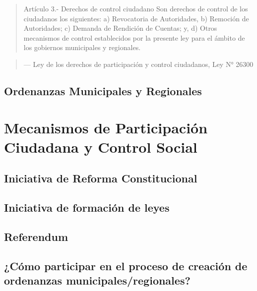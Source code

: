 \documentclass[
]{book}
\begin{document}
\begin{quote}
Artículo 3.- Derechos de control ciudadano
Son derechos de control de los ciudadanos los siguientes:
a) Revocatoria de Autoridades,
b) Remoción de Autoridades;
c) Demanda de Rendición de Cuentas; y,
d) Otros mecanismos de control establecidos por la presente ley para el ámbito de los gobiernos municipales y regionales.
\end{quote}

\begin{quote}
--- Ley de los derechos de participación y control ciudadanos, Ley N° 26300
\end{quote}

\hypertarget{ordenanzas-municipales-y-regionales}{%
\section{Ordenanzas Municipales y Regionales}\label{ordenanzas-municipales-y-regionales}}

\hypertarget{mecanismos-de-participaciuxf3n-ciudadana-y-control-social}{%
\chapter{Mecanismos de Participación Ciudadana y Control Social}\label{mecanismos-de-participaciuxf3n-ciudadana-y-control-social}}

\hypertarget{iniciativa-de-reforma-constitucional}{%
\section{Iniciativa de Reforma Constitucional}\label{iniciativa-de-reforma-constitucional}}

\hypertarget{iniciativa-de-formaciuxf3n-de-leyes}{%
\section{Iniciativa de formación de leyes}\label{iniciativa-de-formaciuxf3n-de-leyes}}

\hypertarget{referendum}{%
\section{Referendum}\label{referendum}}

\hypertarget{cuxf3mo-participar-en-el-proceso-de-creaciuxf3n-de-ordenanzas-municipalesregionales}{%
\section{¿Cómo participar en el proceso de creación de ordenanzas municipales/regionales?}\label{cuxf3mo-participar-en-el-proceso-de-creaciuxf3n-de-ordenanzas-municipalesregionales}}
\end{document}
